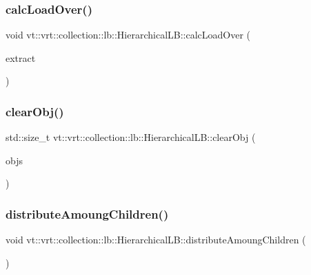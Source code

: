 \subsubsection{\texorpdfstring{calc\+Load\+Over()}{calcLoadOver()}}
{\footnotesize\ttfamily void vt\+::vrt\+::collection\+::lb\+::\+Hierarchical\+L\+B\+::calc\+Load\+Over (\begin{DoxyParamCaption}\item[{\hyperlink{namespacevt_1_1vrt_1_1collection_1_1lb_aeb0f47cf4b89bed7ea05462d0c2e5b5e}{Heap\+Extract\+Enum} const}]{extract }\end{DoxyParamCaption})}

\mbox{\label{structvt_1_1vrt_1_1collection_1_1lb_1_1_hierarchical_l_b_ad5b4484cda2f200f67e925ed1d3e1ba9}} 
\subsubsection{\texorpdfstring{clear\+Obj()}{clearObj()}}
{\footnotesize\ttfamily std\+::size\+\_\+t vt\+::vrt\+::collection\+::lb\+::\+Hierarchical\+L\+B\+::clear\+Obj (\begin{DoxyParamCaption}\item[{\hyperlink{structvt_1_1vrt_1_1collection_1_1lb_1_1_base_l_b_a331d7da5bbf2883238427d86b54ddd7b}{Obj\+Sample\+Type} \&}]{objs }\end{DoxyParamCaption})\hspace{0.3cm}{\ttfamily [private]}}

\mbox{\label{structvt_1_1vrt_1_1collection_1_1lb_1_1_hierarchical_l_b_a4c944c21309ab6971895acfa197e91a4}} 
\subsubsection{\texorpdfstring{distribute\+Amoung\+Children()}{distributeAmoungChildren()}}
{\footnotesize\ttfamily void vt\+::vrt\+::collection\+::lb\+::\+Hierarchical\+L\+B\+::distribute\+Amoung\+Children (\begin{DoxyParamCaption}{ }\end{DoxyParamCaption})\hspace{0.3cm}{\ttfamily [private]}}

